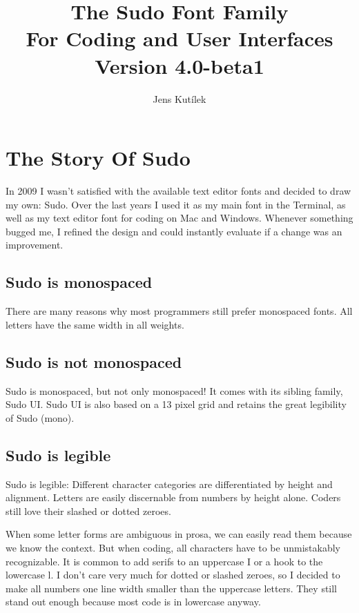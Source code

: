 \documentclass[paper=a4, 10pt]{scrbook}
\title{The Sudo Font Family\\ For Coding and User Interfaces\\ Version 4.0-beta1}
\author{Jens Kutílek}
\begin{document}
\maketitle

\tableofcontents

\chapter{The Story Of Sudo}

In 2009 I wasn’t satisfied with the available text editor fonts and decided to draw my own: Sudo. Over the last years I used it as my main font in the Terminal, as well as my text editor font for coding on Mac and Windows. Whenever something bugged me, I refined the design and could instantly evaluate if a change was an improvement.

\section{Sudo is mono­spaced}

There are many reasons why most programmers still prefer monospaced fonts. All letters have the same width in all weights.

\section{Sudo is not mono­spaced}
Sudo is monospaced, but not only monospaced! It comes with its sibling family, Sudo UI. Sudo UI is also based on a 13 pixel grid and retains the great legibility of Sudo (mono).

\section{Sudo is legible}
Sudo is legible: Different character categories are differentiated by height and alignment. Letters are easily discernable from numbers by height alone. Coders still love their slashed or dotted zeroes.

When some letter forms are ambiguous in prosa, we can easily read them because we know the context. But when coding, all characters have to be unmistakably recognizable. It is common to add serifs to an uppercase I or a hook to the lowercase l. I don’t care very much for dotted or slashed zeroes, so I decided to make all numbers one line width smaller than the uppercase letters. They still stand out enough because most code is in lowercase anyway.
\end{document}
